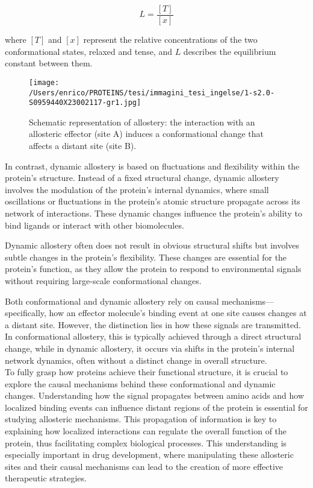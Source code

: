 \documentclass[English, Lau, oneside]{sapthesis}
\begin{document}
\[
L = \frac{[T]}{[x]}
\]

where \([T]\) and \([x]\) represent the relative concentrations of the two conformational states, relaxed and tense, and \(L\) describes the equilibrium constant between them.

\begin{figure}[h]
    \centering
    \texttt{[image: /Users/enrico/PROTEINS/tesi/immagini\_tesi\_ingelse/1-s2.0-S0959440X23002117-gr1.jpg]}
    \caption{Schematic representation of allostery: the interaction with an allosteric effector (site A) induces a conformational change that affects a distant site (site B).}
    \label{fig:allostery_dynamics}
\end{figure}
In contrast, dynamic allostery is based on fluctuations and flexibility within the protein’s structure. Instead of a fixed structural change, dynamic allostery involves the modulation of the protein’s internal dynamics, where small oscillations or fluctuations in the protein’s atomic structure propagate across its network of interactions. These dynamic changes influence the protein's ability to bind ligands or interact with other biomolecules.

Dynamic allostery often does not result in obvious structural shifts but involves subtle changes in the protein's flexibility. These changes are essential for the protein’s function, as they allow the protein to respond to environmental signals without requiring large-scale conformational changes.

Both conformational and dynamic allostery rely on causal mechanisms—specifically, how an effector molecule's binding event at one site causes changes at a distant site. However, the distinction lies in how these signals are transmitted.\\
In conformational allostery, this is typically achieved through a direct structural change, while in dynamic allostery, it occurs via shifts in the protein's internal network dynamics, often without a distinct change in overall structure.\\
To fully grasp how proteins achieve their functional structure, it is crucial to explore the causal mechanisms behind these conformational and dynamic changes. Understanding how the signal propagates between amino acids and how localized binding events can influence distant regions of the protein is essential for studying allosteric mechanisms. This propagation of information is key to explaining how localized interactions can regulate the overall function of the protein, thus facilitating complex biological processes.
This understanding is especially important in drug development, where manipulating these allosteric sites and their causal mechanisms can lead to the creation of more effective therapeutic strategies.
\end{document}

